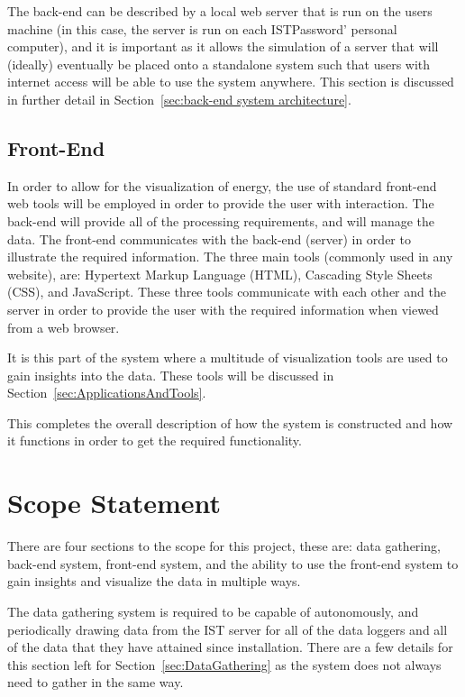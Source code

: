 \documentclass[12pt,onecolumn]{IEEEtran}
\begin{document}
The back-end can be described by a local web server that is run on the users machine (in this case, the server is run on each ISTPassword' personal computer), and it is important as it allows the simulation of a server that will (ideally) eventually be placed onto a standalone system such that users with internet access will be able to use the system anywhere.
This section is discussed in further detail in Section~\ref{sec:back-end system architecture}.

\subsection{Front-End} \label{sec:FrontEnd}
In order to allow for the visualization of energy, the use of standard front-end web tools will be employed in order to provide the user with interaction. 
The back-end will provide all of the processing requirements, and will manage the data. The front-end communicates with the back-end (server) in order to illustrate the required information.
The three main tools (commonly used in any website), are: Hypertext Markup Language (HTML), Cascading Style Sheets (CSS), and JavaScript. 
These three tools communicate with each other and the server in order to provide the user with the required information when viewed from a web browser. 

It is this part of the system where a multitude of visualization tools are used to gain insights into the data. These tools will be discussed in Section~\ref{sec:ApplicationsAndTools}. \newline

This completes the overall description of how the system is constructed and how it functions in order to get the required functionality.


\section{Scope Statement} \label{sec:ScopeStatement}
There are four sections to the scope for this project, these are: data gathering, back-end system, front-end system, and the ability to use the front-end system to gain insights and visualize the data in multiple ways. %

The data gathering system is required to be capable of autonomously, and periodically drawing data from the IST server for all of the data loggers and all of the data that they have attained since installation. There are a few details for this section left for Section~\ref{sec:DataGathering} as the system does not always need to gather in the same way.
\end{document}
